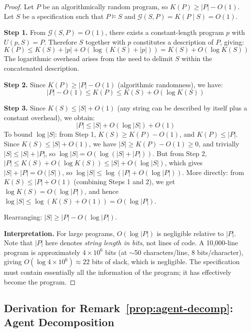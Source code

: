 \documentclass[11pt, a4paper, logo, copyright]{googledeepmind}
\begin{document}
\begin{proof}
Let $P$ be an algorithmically random program, so $K(P) \geq |P| - O(1)$. Let $S$ be a specification such that $P \models S$ and $\mathcal{G}(S, P) = K(P \mid S) = O(1)$.

\textbf{Step 1.} From $\mathcal{G}(S, P) = O(1)$, there exists a constant-length program $p$ with $U(p, S) = P$. Therefore $S$ together with $p$ constitutes a description of $P$, giving:
\begin{equation}
    K(P) \leq K(S) + |p| + O(\log(K(S) + |p|)) = K(S) + O(\log K(S))
\end{equation}
The logarithmic overhead arises from the need to delimit $S$ within the concatenated description.

\textbf{Step 2.} Since $K(P) \geq |P| - O(1)$ (algorithmic randomness), we have:
\begin{equation}
    |P| - O(1) \leq K(P) \leq K(S) + O(\log K(S))
\end{equation}

\textbf{Step 3.} Since $K(S) \leq |S| + O(1)$ (any string can be described by itself plus a constant overhead), we obtain:
\begin{equation}
    |P| \leq |S| + O(\log |S|) + O(1)
\end{equation}
To bound $\log |S|$: from Step 1, $K(S) \geq K(P) - O(1)$, and $K(P) \leq |P|$. Since $K(S) \leq |S| + O(1)$, we have $|S| \geq K(P) - O(1) \geq 0$, and trivially $|S| \leq |S| + |P|$, so $\log |S| = O(\log(|S| + |P|))$. But from Step 2, $|P| \leq K(S) + O(\log K(S)) \leq |S| + O(\log |S|)$, which gives $|S| + |P| = O(|S|)$, so $\log |S| \leq \log(|P| + O(\log |P|))$. More directly: from $K(S) \leq |P| + O(1)$ (combining Steps 1 and 2), we get $\log K(S) = O(\log |P|)$, and hence $\log |S| \leq \log(K(S) + O(1)) = O(\log |P|)$.

Rearranging: $|S| \geq |P| - O(\log |P|)$.

\textbf{Interpretation.} For large programs, $O(\log |P|)$ is negligible relative to $|P|$. Note that $|P|$ here denotes \emph{string length in bits}, not lines of code. A 10,000-line program is approximately $4 \times 10^6$ bits (at $\sim$50 characters/line, 8 bits/character), giving $O(\log 4 \times 10^6) \approx 22$ bits of slack, which is negligible. The specification must contain essentially all the information of the program; it has effectively become the program.
\end{proof}


\subsection{Derivation for Remark~\ref{prop:agent-decomp}: Agent Decomposition}
\end{document}
